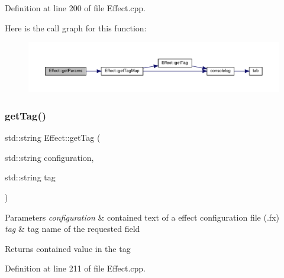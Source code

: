 Definition at line 200 of file Effect.\+cpp.

Here is the call graph for this function\+:
\nopagebreak
\begin{figure}[H]
\begin{center}
\leavevmode
\includegraphics[width=350pt]{class_effect_ac322ae94a6b15b2d81053a55ce7542e2_cgraph}
\end{center}
\end{figure}
\mbox{\label{class_effect_a607ab2a63d333137c1f07cf03611c4bf}} 
\subsubsection{\texorpdfstring{get\+Tag()}{getTag()}}
{\footnotesize\ttfamily std\+::string Effect\+::get\+Tag (\begin{DoxyParamCaption}\item[{std\+::string}]{configuration,  }\item[{std\+::string}]{tag }\end{DoxyParamCaption})\hspace{0.3cm}{\ttfamily [static]}}


\begin{DoxyParams}{Parameters}
{\em configuration} & contained text of a effect configuration file (.fx) \\
\hline
{\em tag} & tag name of the requested field \\
\hline
\end{DoxyParams}
\begin{DoxyReturn}{Returns}
contained value in the tag 
\end{DoxyReturn}


Definition at line 211 of file Effect.\+cpp.

